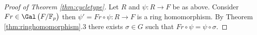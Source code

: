 \begin{proof}[Proof of Theorem \ref{thm:cycletype}]
Let $ R $ and $ \psi : R \to F $ be as above. Consider $ Fr \in \Gal\br{F / \FF_p} $ then $ \psi' = Fr \circ \psi : R \to F $ is a ring homomorphism. By Theorem \ref{thm:ringhomomorphism}.$ 3 $ there exists $ \sigma \in G $ such that $ Fr \circ \psi = \psi \circ \sigma $.
\end{proof}

